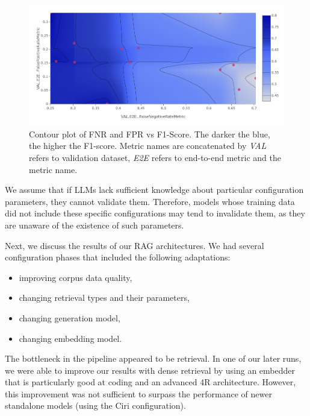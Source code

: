 \begin{figure}[!ht]
    \centering
    \includegraphics[width=\textwidth]{images/FNR-FPR-F1.png}
    \caption{Contour plot of FNR and FPR vs F1-Score. The darker the blue, the higher the F1-score. Metric names are concatenated by \textit{VAL} refers to validation dataset, \textit{E2E} refers to end-to-end metric and the metric name.}
    \label{fig:fnrfpr}
\end{figure}

We assume that if LLMs lack sufficient knowledge about particular configuration parameters, they cannot validate them. Therefore, models whose training data did not include these specific configurations may tend to invalidate them, as they are unaware of the existence of such parameters.

Next, we discuss the results of our RAG architectures. We had several configuration phases that included the following adaptations:
\begin{itemize}
    \item improving corpus data quality,
    \item changing retrieval types and their parameters,
    \item changing generation model,
    \item changing embedding model.
\end{itemize}

The bottleneck in the pipeline appeared to be retrieval. In one of our later runs, we were able to improve our results with dense retrieval by using an embedder that is particularly good at coding and an advanced 4R architecture. However, this improvement was not sufficient to surpass the performance of newer standalone models (using the Ciri configuration).

